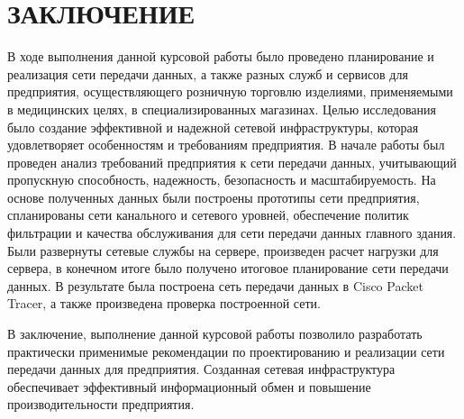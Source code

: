 \documentclass[14pt, a4paper]{extarticle}
\numberwithin{equation}{section}
\begin{document}
\section*{ЗАКЛЮЧЕНИЕ} 
В ходе выполнения данной курсовой работы было проведено
планирование и реализация сети передачи данных, а также разных служб и сервисов для предприятия, осуществляющего розничную торговлю изделиями, применяемыми в
медицинских целях, в специализированных магазинах. Целью исследования было создание
эффективной и надежной сетевой инфраструктуры, которая удовлетворяет
особенностям и требованиям предприятия.
В начале работы был проведен анализ требований предприятия к сети
передачи данных, учитывающий пропускную способность, надежность,
безопасность и масштабируемость. На основе полученных данных были
построены прототипы сети предприятия, спланированы сети канального и сетевого уровней,
обеспечение политик фильтрации и качества обслуживания для сети передачи данных главного здания.
Были развернуты сетевые службы на сервере, произведен расчет нагрузки для сервера, в конечном итоге было получено
итоговое планирование сети передачи данных. В результате была построена сеть передачи данных в Cisco Packet Tracer, а также 
произведена проверка построенной сети.

В заключение, выполнение данной курсовой работы позволило
разработать практически применимые рекомендации по проектированию
и реализации сети передачи данных для предприятия. Созданная сетевая инфраструктура обеспечивает эффективный
информационный обмен и повышение производительности предприятия.
\begingroup
\let\itshape\upshape
\sloppy
\printbibliography[title=СПИСОК ИСПОЛЬЗУЕМЫХ ИСТОЧНИКОВ]
\endgroup
\end{document}
